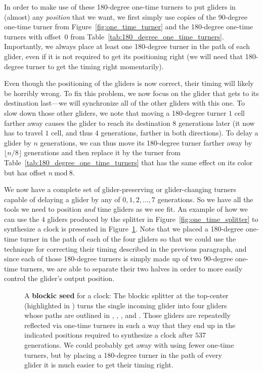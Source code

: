 \clearpage%


In order to make use of these 180-degree one-time turners to put gliders in (almost) any \emph{position} that we want, we first simply use copies of the 90-degree one-time turner from Figure~\ref{fig:one_time_turner} and the 180-degree one-time turners with offset~0 from Table~\ref{tab:180_degree_one_time_turners}. Importantly, we always place at least one 180-degree turner in the path of each glider, even if it is not required to get its positioning right (we will need that 180-degree turner to get the timing right momentarily).

Even though the positioning of the gliders is now correct, their timing will likely be horribly wrong. To fix this problem, we now focus on the glider that gets to its destination last---we will synchronize all of the other gliders with this one. To slow down those other gliders, we note that moving a 180-degree turner $1$ cell farther away causes the glider to reach its destination $8$ generations later (it now has to travel $1$ cell, and thus $4$ generations, farther in both directions). To delay a glider by $n$ generations, we can thus move its 180-degree turner farther away by $\lfloor n/8 \rfloor$ generations and then replace it by the turner from Table~\ref{tab:180_degree_one_time_turners} that has the same effect on its color but has offset $n \ \text{mod} \ 8$.

We now have a complete set of glider-preserving or glider-changing turners capable of delaying a glider by any of $0,1,2,\ldots,7$ generations.  So we have all the tools we need to position \emph{and} time gliders as we see fit. An example of how we can use the $4$ gliders produced by the splitter in Figure~\ref{fig:one_time_splitter} to synthesize a clock is presented in Figure~\ref{fig:clock_slow_salvo}. Note that we placed a 180-degree one-time turner in the path of each of the four gliders so that we could use the technique for correcting their timing described in the previous paragraph, and since each of those 180-degree turners is simply made up of two 90-degree one-time turners, we are able to separate their two halves in order to more easily control the glider's output position.

\begin{figure}[!htb]
	\centering
	\caption{A \textbf{blockic seed} for a clock: The blockic splitter at the top-center (highlighted in ) turns the single incoming glider into four gliders whose paths are outlined in , , , and . Those gliders are repeatedly reflected via one-time turners in such a way that they end up in the indicated positions required to synthesize a clock after $537$ generations. We could probably get away with using fewer one-time turners, but by placing a 180-degree turner in the path of every glider it is much easier to get their timing right.}
	\label{fig:clock_slow_salvo}
\end{figure}

